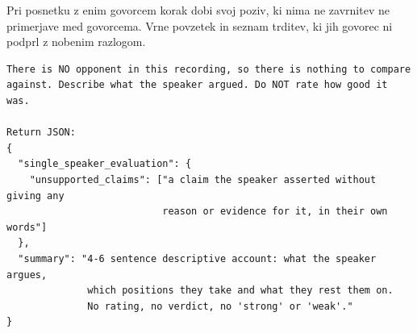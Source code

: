 \documentclass[a4paper, 12pt]{book}
\begin{document}
Pri posnetku z enim govorcem korak dobi svoj poziv, ki nima ne zavrnitev ne
primerjave med govorcema. Vrne povzetek in seznam trditev, ki jih govorec ni
podprl z nobenim razlogom.

\begin{lstlisting}[basicstyle=\ttfamily\scriptsize,breaklines=true]
There is NO opponent in this recording, so there is nothing to compare
against. Describe what the speaker argued. Do NOT rate how good it was.

Return JSON:
{
  "single_speaker_evaluation": {
    "unsupported_claims": ["a claim the speaker asserted without giving any
                           reason or evidence for it, in their own words"]
  },
  "summary": "4-6 sentence descriptive account: what the speaker argues,
              which positions they take and what they rest them on.
              No rating, no verdict, no 'strong' or 'weak'."
}
\end{lstlisting}
\end{document}
